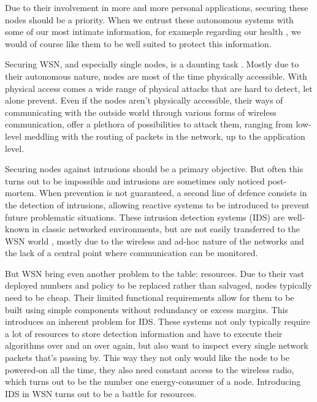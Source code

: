 \documentclass[conference]{IEEEtran}
\begin{document}
Due to their involvement in more and more personal applications, securing these
nodes should be a priority. When we entrust these autonomous systems with some
of our most intimate information, for exameple regarding our health
\cite{stankovic2005wireless}, we would of course like them to be well suited to
protect this information.

Securing WSN, and especially single nodes, is a daunting task
\cite{perrig2004security}. Mostly due to their autonomous nature, nodes are
most of the time physically accessible. With physical access comes a wide range
of physical attacks \cite{becher2006tampering} that are hard to detect, let
alone prevent. Even if the nodes aren't physically accessible, their ways of
communicating with the outside world through various forms of wireless
communication, offer a plethora of possibilities \cite{padmavathi2009survey} to
attack them, ranging from low-level meddling with the routing of packets in the
network, up to the application level.

Securing nodes against intrusions should be a primary objective. But often this
turns out to be impossible and intrusions are sometimes only noticed
post-mortem. When prevention is not guaranteed, a second line of defence
consists in the detection of intrusions, allowing reactive systems to be
introduced to prevent future problematic situations. These intrusion detection
systems (IDS) are well-known in classic networked environments, but are not
easily transferred to the WSN world
\cite{zhang2000intrusion,djenouri2005survey}, mostly due to the wireless and
ad-hoc nature of the networks and the lack of a central point where
communication can be monitored.

But WSN bring even another problem to the table: resources. Due to their vast
deployed numbers and policy to be replaced rather than salvaged, nodes
typically need to be cheap. Their limited functional requirements allow for
them to be built using simple components without redundancy or excess margins.
This introduces an inherent problem for IDS. These systems not only typically
require a lot of resources to store detection information and have to execute
their algorithms over and an over again, but also want to inspect every single
network packets that's passing by. This way they not only would like the node
to be powered-on all the time, they also need constant access to the wireless
radio, which turns out to be the number one energy-consumer of a node.
Introducing IDS in WSN turns out to be a battle for resources.
\end{document}
